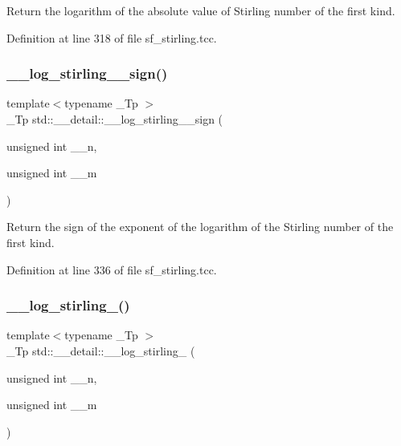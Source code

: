 Return the logarithm of the absolute value of Stirling number of the first kind. 

Definition at line 318 of file sf\+\_\+stirling.\+tcc.

\mbox{\label{namespacestd_1_1____detail_af804ed0eecfca835d1338a48892460b0}} 
\subsubsection{\texorpdfstring{\+\_\+\+\_\+log\+\_\+stirling\+\_\+\_\+sign()}{\_\_log\_stirling\_1\_sign()}}
{\footnotesize\ttfamily template$<$typename \+\_\+\+Tp $>$ \\
\+\_\+\+Tp std\+::\+\_\+\+\_\+detail\+::\+\_\+\+\_\+log\+\_\+stirling\+\_\+\_\+sign (\begin{DoxyParamCaption}\item[{unsigned int}]{\+\_\+\+\_\+n,  }\item[{unsigned int}]{\+\_\+\+\_\+m }\end{DoxyParamCaption})\hspace{0.3cm}{\ttfamily [inline]}}

Return the sign of the exponent of the logarithm of the Stirling number of the first kind. 

Definition at line 336 of file sf\+\_\+stirling.\+tcc.

\mbox{\label{namespacestd_1_1____detail_a7ba1fde0547236676d579b6405f2fb25}} 
\subsubsection{\texorpdfstring{\+\_\+\+\_\+log\+\_\+stirling\+\_()}{\_\_log\_stirling\_2()}}
{\footnotesize\ttfamily template$<$typename \+\_\+\+Tp $>$ \\
\+\_\+\+Tp std\+::\+\_\+\+\_\+detail\+::\+\_\+\+\_\+log\+\_\+stirling\+\_ (\begin{DoxyParamCaption}\item[{unsigned int}]{\+\_\+\+\_\+n,  }\item[{unsigned int}]{\+\_\+\+\_\+m }\end{DoxyParamCaption})}

